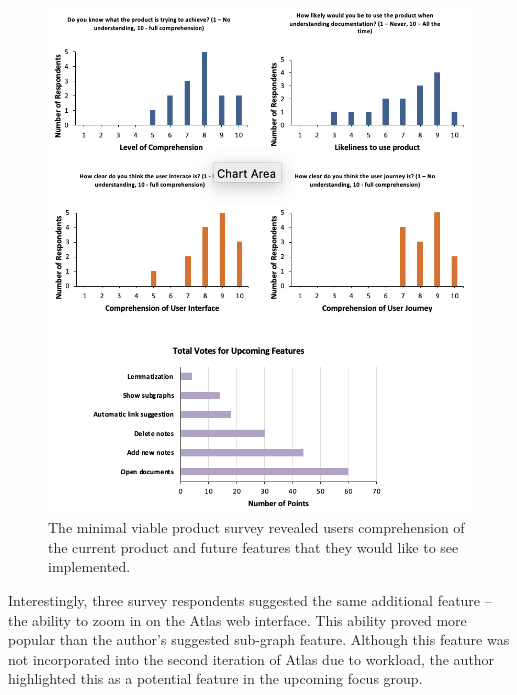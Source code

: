 \documentclass{article}
\begin{document}
\begin{figure}[!htb]
  \centering
      \includegraphics[width=1\textwidth]{images/survey-results.png}
  \caption{The minimal viable product survey revealed users comprehension of the current product and future features that they would like to see implemented.}
  \label{fig:survey}
\end{figure}
\clearpage

Interestingly, three survey respondents suggested the same additional feature – the ability to zoom in on the Atlas web interface. This ability proved more popular than the author’s suggested sub-graph feature. Although this feature was not incorporated into the second iteration of Atlas due to workload, the author highlighted this as a potential feature in the upcoming focus group.
\end{document}
